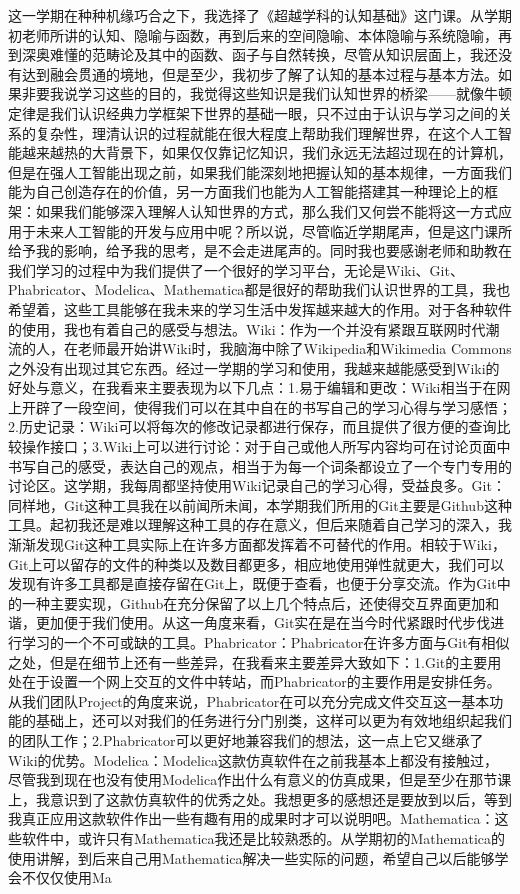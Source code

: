 \documentclass[11pt,fleqn]{book}
\numberwithin{dummy}{section}
\theoremstyle{ocrenumbox}
\theoremstyle{blacknumex}
\theoremstyle{blacknumbox}
\theoremstyle{ocrenum}
\newenvironment{remark}[1]{\par\vspace{10pt}\small %
	\begin{list}{}{
			\leftmargin=35pt %
			\rightmargin=25pt}\item\ignorespaces %
		\makebox[-2.5pt]{\begin{tikzpicture}[overlay]
			\node[draw=ocre!60,line width=1pt,circle,fill=ocre!25,font=\sffamily\bfseries,inner sep=2pt,outer sep=0pt] at (-15pt,0pt){\textcolor{ocre}{#1}};\end{tikzpicture}} %
		\advance\baselineskip -1pt}{\end{list}\vskip5pt} %
\newlength\esp
\begin{document}
\begin{remark}{费}
	这一学期在种种机缘巧合之下，我选择了《超越学科的认知基础》这门课。从学期初老师所讲的认知、隐喻与函数，再到后来的空间隐喻、本体隐喻与系统隐喻，再到深奥难懂的范畴论及其中的函数、函子与自然转换，尽管从知识层面上，我还没有达到融会贯通的境地，但是至少，我初步了解了认知的基本过程与基本方法。如果非要我说学习这些的目的，我觉得这些知识是我们认知世界的桥梁——就像牛顿定律是我们认识经典力学框架下世界的基础一眼，只不过由于认识与学习之间的关系的复杂性，理清认识的过程就能在很大程度上帮助我们理解世界，在这个人工智能越来越热的大背景下，如果仅仅靠记忆知识，我们永远无法超过现在的计算机，但是在强人工智能出现之前，如果我们能深刻地把握认知的基本规律，一方面我们能为自己创造存在的价值，另一方面我们也能为人工智能搭建其一种理论上的框架：如果我们能够深入理解人认知世界的方式，那么我们又何尝不能将这一方式应用于未来人工智能的开发与应用中呢？所以说，尽管临近学期尾声，但是这门课所给予我的影响，给予我的思考，是不会走进尾声的。同时我也要感谢老师和助教在我们学习的过程中为我们提供了一个很好的学习平台，无论是Wiki、Git、Phabricator、Modelica、Mathematica都是很好的帮助我们认识世界的工具，我也希望着，这些工具能够在我未来的学习生活中发挥越来越大的作用。对于各种软件的使用，我也有着自己的感受与想法。Wiki：作为一个并没有紧跟互联网时代潮流的人，在老师最开始讲Wiki时，我脑海中除了Wikipedia和Wikimedia Commons之外没有出现过其它东西。经过一学期的学习和使用，我越来越能感受到Wiki的好处与意义，在我看来主要表现为以下几点：1.易于编辑和更改：Wiki相当于在网上开辟了一段空间，使得我们可以在其中自在的书写自己的学习心得与学习感悟；2.历史记录：Wiki可以将每次的修改记录都进行保存，而且提供了很方便的查询比较操作接口；3.Wiki上可以进行讨论：对于自己或他人所写内容均可在讨论页面中书写自己的感受，表达自己的观点，相当于为每一个词条都设立了一个专门专用的讨论区。这学期，我每周都坚持使用Wiki记录自己的学习心得，受益良多。Git：同样地，Git这种工具我在以前闻所未闻，本学期我们所用的Git主要是Github这种工具。起初我还是难以理解这种工具的存在意义，但后来随着自己学习的深入，我渐渐发现Git这种工具实际上在许多方面都发挥着不可替代的作用。相较于Wiki，Git上可以留存的文件的种类以及数目都更多，相应地使用弹性就更大，我们可以发现有许多工具都是直接存留在Git上，既便于查看，也便于分享交流。作为Git中的一种主要实现，Github在充分保留了以上几个特点后，还使得交互界面更加和谐，更加便于我们使用。从这一角度来看，Git实在是在当今时代紧跟时代步伐进行学习的一个不可或缺的工具。Phabricator：Phabricator在许多方面与Git有相似之处，但是在细节上还有一些差异，在我看来主要差异大致如下：1.Git的主要用处在于设置一个网上交互的文件中转站，而Phabricator的主要作用是安排任务。从我们团队Project的角度来说，Phabricator在可以充分完成文件交互这一基本功能的基础上，还可以对我们的任务进行分门别类，这样可以更为有效地组织起我们的团队工作；2.Phabricator可以更好地兼容我们的想法，这一点上它又继承了Wiki的优势。Modelica：Modelica这款仿真软件在之前我基本上都没有接触过，尽管我到现在也没有使用Modelica作出什么有意义的仿真成果，但是至少在那节课上，我意识到了这款仿真软件的优秀之处。我想更多的感想还是要放到以后，等到我真正应用这款软件作出一些有趣有用的成果时才可以说明吧。Mathematica：这些软件中，或许只有Mathematica我还是比较熟悉的。从学期初的Mathematica的使用讲解，到后来自己用Mathematica解决一些实际的问题，希望自己以后能够学会不仅仅使用Ma
\end{remark}
\end{document}
